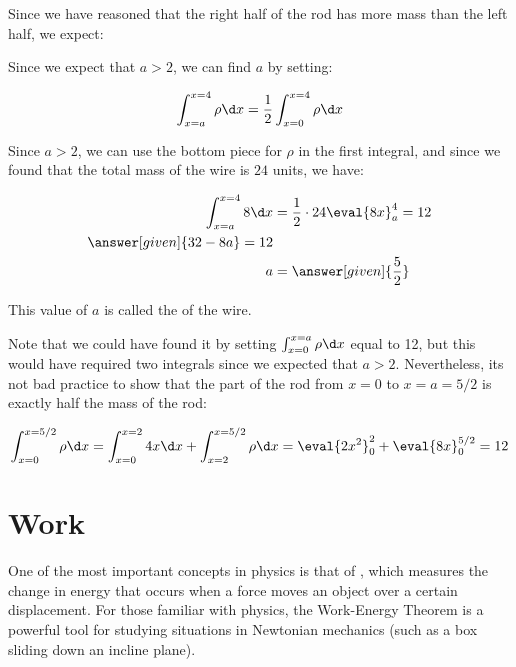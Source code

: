 \documentclass{ximera}
\begin{document}
\begin{example}
\begin{explanation}
Since we have reasoned that the right half of the rod has more mass than the left half, we expect:

\begin{multipleChoice}
\end{multipleChoice}
 
 Since we expect that $a>2$, we can find $a$ by setting:
 
 \[
 \int_{x=a}^{x=4} \rho \d x = \frac{1}{2} \int_{x=0}^{x=4} \rho \d x \\
 \]
 
 Since $a>2$, we can use the bottom piece for $\rho$ in the first integral, and since we found that the total mass of the wire is $24$ units, we have:
 
 
 \begin{align*}
  \int_{x=a}^{x=4} 8 \d x &= \frac{1}{2} \cdot 24
  \eval{8x}_a^4 =12 \\
  \answer[given]{32-8a} = 12 \\
  a &= \answer[given]{\frac{5}{2}}
  \end{align*}
  
  \begin{remark}
  This value of $a$ is called the  of the wire.  
  
Note that we could have found it by setting $\int_{x=0}^{x=a} \rho \d x$ equal to 12, but this would have required two integrals since we expected that $a>2$.  Nevertheless, its not bad practice to show that the part of the rod from $x=0$ to $x=a=5/2$ is exactly half the mass of the rod:
  
  \[
  \int_{x=0}^{x=5/2} \rho \d x =   \int_{x=0}^{x=2} 4x \d x +  \int_{x=2}^{x=5/2} \rho \d x =\eval{2x^2}_0^2+\eval{8x}_0^{5/2} = 12
  \]

  \end{remark}
   \end{explanation}

\end{example}


\section{Work}
One of the most important concepts in physics is that of , which measures the change in energy that occurs when a force moves an object over a certain displacement.  For those familiar with physics, the Work-Energy Theorem is a powerful tool for studying situations in Newtonian mechanics (such as a box sliding down an incline plane). 
\end{document}
